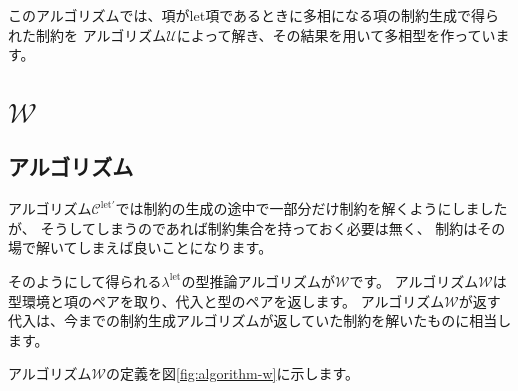 このアルゴリズムでは、項がlet項であるときに多相になる項の制約生成で得られた制約を
アルゴリズム$\mathcal U$によって解き、その結果を用いて多相型を作っています。

\section{$\mathcal W$}

\subsection{アルゴリズム}

アルゴリズム$\mathcal C^\mathrm{let'}$では制約の生成の途中で一部分だけ制約を解くようにしましたが、
そうしてしまうのであれば制約集合を持っておく必要は無く、
制約はその場で解いてしまえば良いことになります。

そのようにして得られる$\lambda^\mathrm{let}$の型推論アルゴリズムが$\mathcal W$です。
アルゴリズム$\mathcal W$は型環境と項のペアを取り、代入と型のペアを返します。
アルゴリズム$\mathcal W$が返す代入は、今までの制約生成アルゴリズムが返していた制約を解いたものに相当します。

アルゴリズム$\mathcal W$の定義を図\ref{fig:algorithm-w}に示します。

